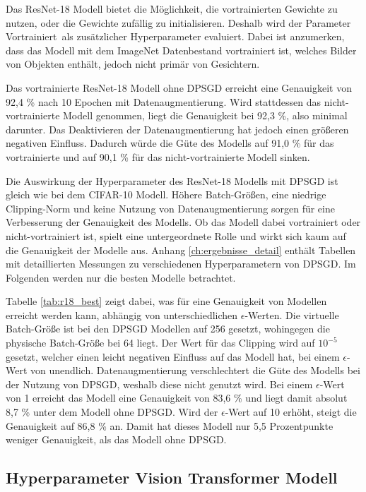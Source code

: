 Das ResNet-18 Modell bietet die Möglichkeit, die vortrainierten Gewichte zu nutzen, oder die Gewichte zufällig zu initialisieren.
Deshalb wird der Parameter \dq Vortrainiert\dq\ als zusätzlicher Hyperparameter evaluiert.
Dabei ist anzumerken, dass das Modell mit dem ImageNet Datenbestand vortrainiert ist, welches Bilder von Objekten enthält, jedoch nicht primär von Gesichtern.

Das vortrainierte ResNet-18 Modell ohne DPSGD erreicht eine Genauigkeit von 92,4 \% nach 10 Epochen mit Datenaugmentierung.
Wird stattdessen das nicht-vortrainierte Modell genommen, liegt die Genauigkeit bei 92,3 \%, also minimal darunter.
Das Deaktivieren der Datenaugmentierung hat jedoch einen größeren negativen Einfluss. 
Dadurch würde die Güte des Modells auf 91,0 \% für das vortrainierte und auf 90,1 \% für das nicht-vortrainierte Modell sinken.

Die Auswirkung der Hyperparameter des ResNet-18 Modells mit DPSGD ist gleich wie bei dem CIFAR-10 Modell.
Höhere Batch-Größen, eine niedrige Clipping-Norm und keine Nutzung von Datenaugmentierung sorgen für eine Verbesserung der Genauigkeit des Modells. 
Ob das Modell dabei vortrainiert oder nicht-vortrainiert ist, spielt eine untergeordnete Rolle und wirkt sich kaum auf die Genauigkeit der Modelle aus.
Anhang \ref{ch:ergebnisse_detail} enthält Tabellen mit detaillierten Messungen zu verschiedenen Hyperparametern von DPSGD.
Im Folgenden werden nur die besten Modelle betrachtet.



Tabelle \ref{tab:r18_best} zeigt dabei, was für eine Genauigkeit von Modellen erreicht werden kann, abhängig von unterschiedlichen $\epsilon$-Werten.
Die virtuelle Batch-Größe ist bei den DPSGD Modellen auf 256 gesetzt, wohingegen die physische Batch-Größe bei 64 liegt.
Der Wert für das Clipping wird auf $10^{-5}$ gesetzt, welcher einen leicht negativen Einfluss auf das Modell hat, bei einem $\epsilon$-Wert von unendlich.
Datenaugmentierung verschlechtert die Güte des Modells bei der Nutzung von DPSGD, weshalb diese nicht genutzt wird.
Bei einem $\epsilon$-Wert von 1 erreicht das Modell eine Genauigkeit von 83,6 \% und liegt damit absolut 8,7 \% unter dem Modell ohne DPSGD. 
Wird der $\epsilon$-Wert auf 10 erhöht, steigt die Genauigkeit auf 86,8 \% an. 
Damit hat dieses Modell nur 5,5 Prozentpunkte weniger Genauigkeit, als das Modell ohne DPSGD.

\subsection{Hyperparameter Vision Transformer Modell}

